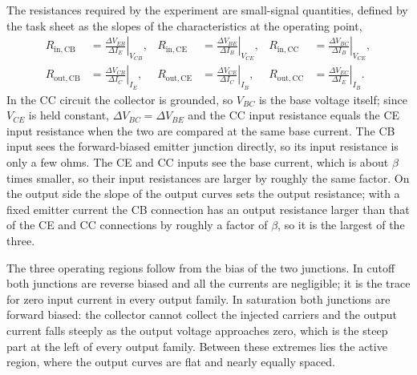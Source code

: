 \documentclass[12pt,a4paper]{article}
\begin{document}
	The resistances required by the experiment are small-signal quantities,
	defined by the task sheet as the slopes of the characteristics at the
	operating point,
	\begin{equation}
		\begin{aligned}
			R_{\mathrm{in,CB}} &= \left.\frac{\Delta V_{EB}}{\Delta I_E}\right|_{V_{CB}}, &
			R_{\mathrm{in,CE}} &= \left.\frac{\Delta V_{BE}}{\Delta I_B}\right|_{V_{CE}}, &
			R_{\mathrm{in,CC}} &= \left.\frac{\Delta V_{BC}}{\Delta I_B}\right|_{V_{CE}},\\[6pt]
			R_{\mathrm{out,CB}} &= \left.\frac{\Delta V_{CB}}{\Delta I_C}\right|_{I_E}, &
			R_{\mathrm{out,CE}} &= \left.\frac{\Delta V_{CE}}{\Delta I_C}\right|_{I_B}, &
			R_{\mathrm{out,CC}} &= \left.\frac{\Delta V_{EC}}{\Delta I_E}\right|_{I_B}.
		\end{aligned}
		\label{eq:resdef}
	\end{equation}
	In the CC circuit the collector is grounded, so $V_{BC}$ is the base
	voltage itself; since $V_{CE}$ is held constant, $\Delta V_{BC} = \Delta
	V_{BE}$ and the CC input resistance equals the CE input resistance when
	the two are compared at the same base current. The CB input sees the
	forward-biased emitter junction directly, so its input resistance is only
	a few ohms. The CE and CC inputs see the base current, which is about
	$\beta$ times smaller, so their input resistances are larger by roughly the
	same factor. On the output side the slope of the output curves sets the
	output resistance; with a fixed emitter current the CB connection has an
	output resistance larger than that of the CE and CC connections by roughly
	a factor of $\beta$, so it is the largest of the three.

	The three operating regions follow from the bias of the two junctions.
	In cutoff both junctions are reverse biased and all the currents are
	negligible; it is the trace for zero input current in every output
	family. In saturation both junctions are forward biased: the
	collector cannot collect the injected carriers and the output current
	falls steeply as the output voltage approaches zero, which is the steep
	part at the left of every output family. Between these extremes lies the
	active region, where the output curves are flat and nearly equally
	spaced.


\end{document}
